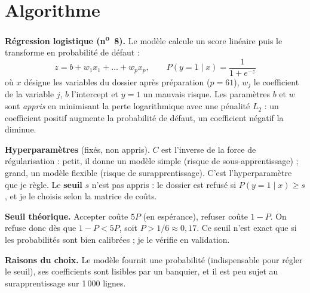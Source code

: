 \documentclass[10.5pt,a4paper]{article}
\begin{document}
\section{Algorithme}
\textbf{Régression logistique (n\textsuperscript{o}~8).} Le modèle calcule un score linéaire puis le transforme en probabilité de défaut :
\[
z = b + w_1x_1 + \dots + w_p x_p,\qquad P(y=1\mid x)=\frac{1}{1+e^{-z}}
\]
où $x$ désigne les variables du dossier après préparation ($p=61$), $w_j$ le coefficient de la variable $j$, $b$ l'intercept et $y=1$ un mauvais risque. Les paramètres $b$ et $w$ sont \emph{appris} en minimisant la perte logarithmique avec une pénalité $L_2$ : un coefficient positif augmente la probabilité de défaut, un coefficient négatif la diminue.

\textbf{Hyperparamètres} (fixés, non appris). $C$ est l'inverse de la force de régularisation : petit, il donne un modèle simple (risque de sous-apprentissage) ; grand, un modèle flexible (risque de surapprentissage). C'est l'hyperparamètre que je règle. Le \textbf{seuil} $s$ n'est pas appris : le dossier est refusé si $P(y=1\mid x)\geq s$, et je le choisis selon la matrice de coûts.

\textbf{Seuil théorique.} Accepter coûte $5P$ (en espérance), refuser coûte $1-P$. On refuse donc dès que $1-P<5P$, soit $P>1/6\approx 0{,}17$. Ce seuil n'est exact que si les probabilités sont bien calibrées ; je le vérifie en validation.

\textbf{Raisons du choix.} Le modèle fournit une probabilité (indispensable pour régler le seuil), ses coefficients sont lisibles par un banquier, et il est peu sujet au surapprentissage sur 1\,000 lignes.

\end{document}
